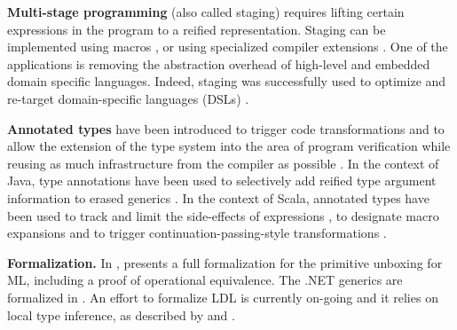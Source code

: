\textbf{Multi-stage programming} (also called staging) \cite{taha-intro} requires lifting certain expressions in the program to a reified representation. Staging can be implemented using macros \cite{taha-macroml, eugene-macros, yin-yang}, or using specialized compiler extensions \cite{scala-virtualized}. One of the applications is removing the abstraction overhead of high-level and embedded domain specific languages. Indeed, staging was successfully used to optimize and re-target domain-specific languages (DSLs) \cite{tiark-thesis, tiark-lms, tiark-building-blocks, delite, nada-js, staged-sac}.

\textbf{Annotated types} \cite{sip-annotations, jsr-annotations} have been introduced to trigger code transformations and to allow the extension of the type system into the area of program verification while reusing as much infrastructure from the compiler as possible \cite{papi-annot-typechecker}. In the context of Java, type annotations have been used to selectively add reified type argument information to erased generics \cite{prodromos-refied-type-args}. In the context of Scala, annotated types have been used to track and limit the side-effects of expressions \cite{lukas-effects-ecoop, lukas-thesis}, to designate macro expansions \cite{eugene-macros} and to trigger continuation-passing-style transformations \cite{tiark-cps}.

\textbf{Formalization.} In \cite{leroy-unboxed-objects},  presents a full formalization for the primitive unboxing for ML, including a proof of operational equivalence. The .NET generics are formalized in \cite{dot-net-generics-form}. An effort to formalize LDL is currently on-going \cite{ldl-form} and it relies on local type inference, as described by  \cite{odersky-colored-local-type-inf} and  \cite{pierce-local-type-inference}.

